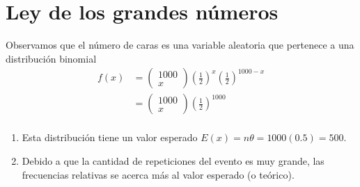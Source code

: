 \documentclass[12pt, letterpaper]{article}
\begin{document}
\section{Ley de los grandes números}
Observamos que el número de caras es una variable aleatoria que pertenece a una distribución binomial
\begin{equation*}
    \begin{aligned}
        f(x)
        & =
        \left(
            \begin{matrix}
                1000 \\
                x
            \end{matrix}
        \right)
        \left(\frac{1}{2}\right)^{x}\left(\frac{1}{2}\right)^{1000-x} \\
        & =
        \left(
            \begin{matrix}
                1000 \\
                x
            \end{matrix}
        \right)
        \left(\frac{1}{2}\right)^{1000} \\
    \end{aligned}
\end{equation*}
\begin{enumerate}
    \item Esta distribución tiene un valor esperado $E(x) = n\theta = 1000(0.5) = 500$.
    \item Debido a que la cantidad de repeticiones del evento es muy grande, las frecuencias relativas se acerca más al valor esperado (o teórico).
\end{enumerate}
\end{document}
